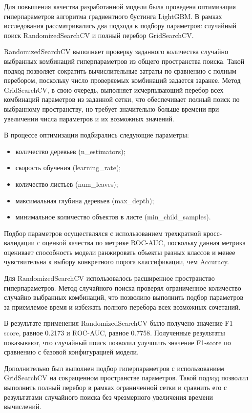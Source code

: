 Для повышения качества разработанной модели была проведена оптимизация гиперпараметров алгоритма градиентного бустинга LightGBM. В рамках исследования рассматривались два подхода к подбору параметров: случайный поиск RandomizedSearchCV и полный перебор GridSearchCV.

RandomizedSearchCV выполняет проверку заданного количества случайно выбранных комбинаций гиперпараметров из общего пространства поиска. Такой подход позволяет сократить вычислительные затраты по сравнению с полным перебором, поскольку число проверяемых комбинаций задается заранее. Метод GridSearchCV, в свою очередь, выполняет исчерпывающий перебор всех комбинаций параметров из заданной сетки, что обеспечивает полный поиск по выбранному пространству, но требует значительно больше времени при увеличении числа параметров и их возможных значений.

В процессе оптимизации подбирались следующие параметры:
\begin{itemize}
    \item количество деревьев (n\_estimators);
    \item скорость обучения (learning\_rate);
    \item количество листьев (num\_leaves);
    \item максимальная глубина деревьев (max\_depth);
    \item минимальное количество объектов в листе (min\_child\_samples).
\end{itemize}

Подбор параметров осуществлялся с использованием трехкратной кросс-валидации с оценкой качества по метрике ROC-AUC, поскольку данная метрика оценивает способность модели ранжировать объекты разных классов и менее чувствительна к выбору конкретного порога классификации, чем Accuracy.

Для RandomizedSearchCV использовалось расширенное пространство гиперпараметров. Метод случайного поиска проверял ограниченное количество случайно выбранных комбинаций, что позволило выполнить подбор параметров за приемлемое время и избежать полного перебора всех возможных сочетаний.

В результате применения RandomizedSearchCV было получено значение F1-score, равное 0.2173 и ROC-AUC, равное 0.7758. Полученные результаты показывают, что случайный поиск позволил улучшить значение F1-score по сравнению с базовой конфигурацией модели.

Дополнительно был выполнен подбор гиперпараметров с использованием GridSearchCV на сокращенном пространстве параметров. Такой подход позволил выполнить полный перебор в рамках ограниченной сетки и сравнить его с результатами случайного поиска без чрезмерного увеличения времени вычислений.

